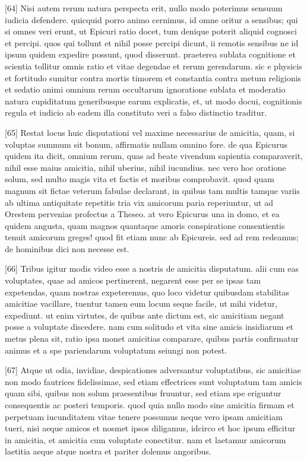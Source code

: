 \documentclass{article}
\begin{document}
[64] Nisi autem rerum natura perspecta erit, nullo modo poterimus sensuum iudicia defendere. quicquid porro animo cernimus, id omne oritur a sensibus; qui si omnes veri erunt, ut Epicuri ratio docet, tum denique poterit aliquid cognosci et percipi. quos qui tollunt et nihil posse percipi dicunt, ii remotis sensibus ne id ipsum quidem expedire possunt, quod disserunt. praeterea sublata cognitione et scientia tollitur omnis ratio et vitae degendae et rerum gerendarum. sic e physicis et fortitudo sumitur contra mortis timorem et constantia contra metum religionis et sedatio animi omnium rerum occultarum ignoratione sublata et moderatio natura cupiditatum generibusque earum explicatis, et, ut modo docui, cognitionis regula et iudicio ab eadem illa constituto veri a falso distinctio traditur.

[65] Restat locus huic disputationi vel maxime necessarius de amicitia, quam, si voluptas summum sit bonum, affirmatis nullam omnino fore. de qua Epicurus quidem ita dicit, omnium rerum, quas ad beate vivendum sapientia comparaverit, nihil esse maius amicitia, nihil uberius, nihil iucundius. nec vero hoc oratione solum, sed multo magis vita et factis et moribus comprobavit. quod quam magnum sit fictae veterum fabulae declarant, in quibus tam multis tamque variis ab ultima antiquitate repetitis tria vix amicorum paria reperiuntur, ut ad Orestem pervenias profectus a Theseo. at vero Epicurus una in domo, et ea quidem angusta, quam magnos quantaque amoris conspiratione consentientis tenuit amicorum greges! quod fit etiam nunc ab Epicureis. sed ad rem redeamus; de hominibus dici non necesse est.

[66] Tribus igitur modis video esse a nostris de amicitia disputatum. alii cum eas voluptates, quae ad amicos pertinerent, negarent esse per se ipsas tam expetendas, quam nostras expeteremus, quo loco videtur quibusdam stabilitas amicitiae vacillare, tuentur tamen eum locum seque facile, ut mihi videtur, expediunt. ut enim virtutes, de quibus ante dictum est, sic amicitiam negant posse a voluptate discedere. nam cum solitudo et vita sine amicis insidiarum et metus plena sit, ratio ipsa monet amicitias comparare, quibus partis confirmatur animus et a spe pariendarum voluptatum seiungi non potest.

[67] Atque ut odia, invidiae, despicationes adversantur voluptatibus, sic amicitiae non modo fautrices fidelissimae, sed etiam effectrices sunt voluptatum tam amicis quam sibi, quibus non solum praesentibus fruuntur, sed etiam spe eriguntur consequentis ac posteri temporis. quod quia nullo modo sine amicitia firmam et perpetuam iucunditatem vitae tenere possumus neque vero ipsam amicitiam tueri, nisi aeque amicos et nosmet ipsos diligamus, idcirco et hoc ipsum efficitur in amicitia, et amicitia cum voluptate conectitur. nam et laetamur amicorum laetitia aeque atque nostra et pariter dolemus angoribus.
\end{document}
